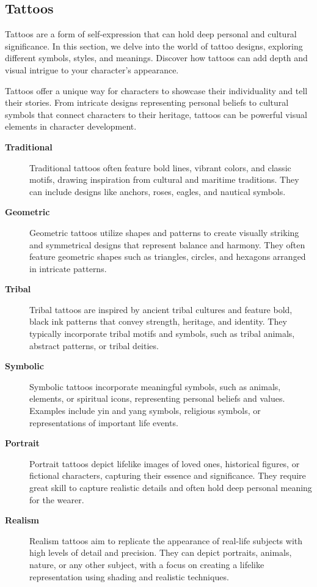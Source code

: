 \documentclass[12pt]{book}
\begin{document}
\subsection{\textbf{Tattoos}}

Tattoos are a form of self-expression that can hold deep personal and cultural significance. In this section, we delve into the world of tattoo designs, exploring different symbols, styles, and meanings. Discover how tattoos can add depth and visual intrigue to your character's appearance.

Tattoos offer a unique way for characters to showcase their individuality and tell their stories. From intricate designs representing personal beliefs to cultural symbols that connect characters to their heritage, tattoos can be powerful visual elements in character development.

\begin{description}
    \item[\textbf{Traditional}] Traditional tattoos often feature bold lines, vibrant colors, and classic motifs, drawing inspiration from cultural and maritime traditions. They can include designs like anchors, roses, eagles, and nautical symbols.
    
    \item[\textbf{Geometric}] Geometric tattoos utilize shapes and patterns to create visually striking and symmetrical designs that represent balance and harmony. They often feature geometric shapes such as triangles, circles, and hexagons arranged in intricate patterns.
    
    \item[\textbf{Tribal}] Tribal tattoos are inspired by ancient tribal cultures and feature bold, black ink patterns that convey strength, heritage, and identity. They typically incorporate tribal motifs and symbols, such as tribal animals, abstract patterns, or tribal deities.
    
    \item[\textbf{Symbolic}] Symbolic tattoos incorporate meaningful symbols, such as animals, elements, or spiritual icons, representing personal beliefs and values. Examples include yin and yang symbols, religious symbols, or representations of important life events.
    
    \item[\textbf{Portrait}] Portrait tattoos depict lifelike images of loved ones, historical figures, or fictional characters, capturing their essence and significance. They require great skill to capture realistic details and often hold deep personal meaning for the wearer.
    
    \item[\textbf{Realism}] Realism tattoos aim to replicate the appearance of real-life subjects with high levels of detail and precision. They can depict portraits, animals, nature, or any other subject, with a focus on creating a lifelike representation using shading and realistic techniques.
\end{description}
\end{document}
